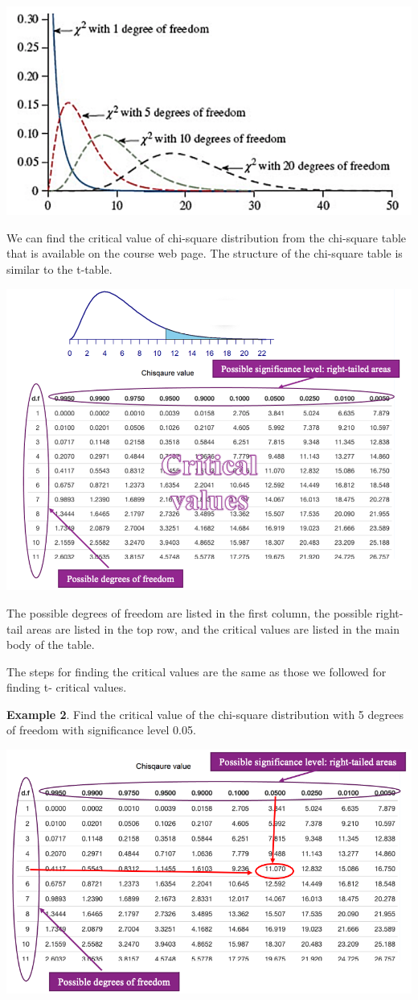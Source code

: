 \documentclass[
]{article}
\begin{document}
\begin{center}\includegraphics[width=0.6\linewidth]{week13/chisqDensity} \end{center}

We can find the critical value of chi-square distribution from the
chi-square table that is available on the course web page. The structure
of the chi-square table is similar to the t-table.

\begin{center}\includegraphics[width=0.8\linewidth]{week13/chisqTable} \end{center}

The possible degrees of freedom are listed in the first column, the
possible right-tail areas are listed in the top row, and the critical
values are listed in the main body of the table.

The steps for finding the critical values are the same as those we
followed for finding t- critical values.

\textbf{Example 2}. Find the critical value of the chi-square
distribution with 5 degrees of freedom with significance level 0.05.

\begin{center}\includegraphics[width=0.8\linewidth]{week13/example02ChisqCV} \end{center}
\end{document}
